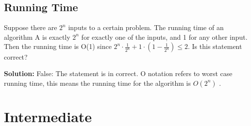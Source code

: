 \documentclass[11pt,fleqn]{book}
\begin{document}
\subsection{Running Time}
\begin{example}
Suppose there are $2^n$ inputs to a certain problem. The running time of an algorithm A is exactly $2^n$ for exactly one of the inputs, and 1 for any other input. Then the running time is O(1) since $2^n \cdot \frac{1}{2^n} + 1\cdot(1 - \frac{1}{2^n}) \leq 2$. Is this statement correct?
\end{example}
\textbf{Solution:} 
False: The statement is in correct. O notation refers to worst case running time, this means the running time for the algorithm is $O(2^n)$ .
\section{Intermediate}
\end{document}
